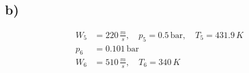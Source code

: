 

\subsection*{b)}
\begin{align*}
    W_5 &= 220 \, \frac{m}{s}, \quad p_5 = 0.5 \, \text{bar}, \quad T_5 = 431.9 \, K \\
    p_6 &= 0.101 \, \text{bar} \\
    W_6 &= 510 \, \frac{m}{s}, \quad T_6 = 340 \, K
\end{align*}